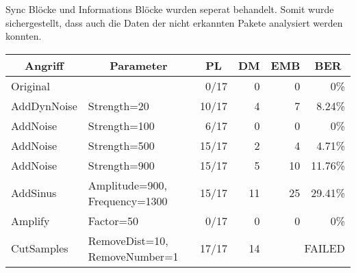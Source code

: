 Sync Blöcke  und Informations Blöcke wurden seperat behandelt. Somit wurde sichergestellt, dass auch die Daten der nicht erkannten Pakete analysiert werden konnten.  

\begin{table}[h]
\small
\begin{tabular}{llrrrr}
\hline
\multicolumn{1}{c}{\textbf{Angriff}} & \multicolumn{1}{c}{\textbf{Parameter}} & \multicolumn{1}{c}{\textbf{PL}} & \multicolumn{1}{c}{\textbf{DM}} & \multicolumn{1}{c}{\textbf{EMB}} & \multicolumn{1}{c}{\textbf{BER}} \\ \hline
Original                             &                                        & 0/17                            & 0                               & 0                                & 0\%                              \\
AddDynNoise                          & Strength=20                            & 10/17                           & 4                               & 7                                & 8.24\%                           \\
AddNoise                             & Strength=100                           & 6/17                            & 0                               & 0                                & 0\%                              \\
AddNoise                             & Strength=500                           & 15/17                           & 2                               & 4                                & 4.71\%                           \\
AddNoise                             & Strength=900                           & 15/17                           & 5                               & 10                               & 11.76\%                          \\
AddSinus                             & Amplitude=900, Frequency=1300          & 15/17                           & 11                              & 25                               & 29.41\%                          \\
Amplify                              & Factor=50                              & 0/17                            & 0                               & 0                                & 0\%                              \\
CutSamples                           & RemoveDist=10, RemoveNumber=1          & 17/17                           & 14                              & \multicolumn{2}{r}{FAILED}                                          \\

\end{tabular}
\end{table}
